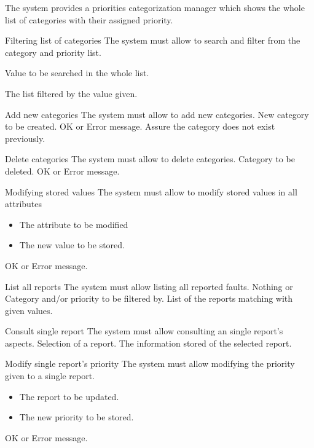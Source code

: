 
The system provides a priorities categorization manager which shows the whole list of categories with their assigned priority.

\begin{requirement}{Filtering list of categories}
\reqdesc The system must allow to search and filter from the category and priority list.

\reqin Value to be searched in the whole list.

\reqout The list filtered by the value given.
\end{requirement}


\begin{requirement}{Add new categories}
\reqdesc  The system must allow to add new categories.
\reqin New category to be created.
\reqout OK or Error message.
\reqsteps Assure the category does not exist previously.
\end{requirement}

\begin{requirement}{Delete categories}
\reqdesc  The system must allow to delete categories.
\reqin Category to be deleted.
\reqout OK or Error message.
\end{requirement}


\begin{requirement}{Modifying stored values}
\reqdesc The system must allow to modify stored values in all attributes
\reqin
\begin{itemize}
\item The attribute to be modified
\item The new value to be stored.
\end{itemize}

\reqout OK or Error message.
\end{requirement}


\begin{requirement}{List all reports}
\reqdesc The system must allow listing all reported faults.
\reqin Nothing or Category and/or priority to be filtered by.
\reqout List of the reports matching with given values.
\end{requirement}

\begin{requirement}{Consult single report}
\reqdesc The system must allow consulting an single report's aspects.
\reqin Selection of a report.
\reqout The information stored of the selected report.
\end{requirement}

\begin{requirement}{Modify single report's priority}
\reqdesc The system must allow modifying the priority given to a single report.
\reqin \begin{itemize}
\item The report to be updated.
\item The new priority to be stored.
\end{itemize}
\reqout OK or Error message.

\end{requirement}




